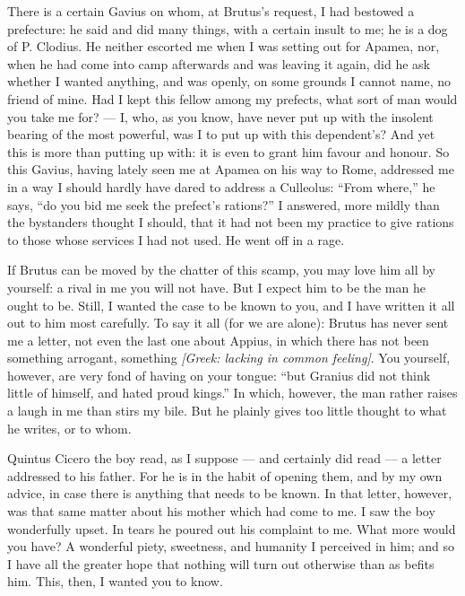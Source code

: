  There is a certain Gavius on whom, at Brutus's request, I had bestowed a prefecture: he said and did many things, with a certain insult to me; he is a dog of P. Clodius. He neither escorted me when I was setting out for Apamea, nor, when he had come into camp afterwards and was leaving it again, did he ask whether I wanted anything, and was openly, on some grounds I cannot name, no friend of mine. Had I kept this fellow among my prefects, what sort of man would you take me for? --- I, who, as you know, have never put up with the insolent bearing of the most powerful, was I to put up with this dependent's? And yet this is more than putting up with: it is even to grant him favour and honour. So this Gavius, having lately seen me at Apamea on his way to Rome, addressed me in a way I should hardly have dared to address a Culleolus: ``From where,'' he says, ``do you bid me seek the prefect's rations?'' I answered, more mildly than the bystanders thought I should, that it had not been my practice to give rations to those whose services I had not used. He went off in a rage.

 If Brutus can be moved by the chatter of this scamp, you may love him all by yourself: a rival in me you will not have. But I expect him to be the man he ought to be. Still, I wanted the case to be known to you, and I have written it all out to him most carefully. To say it all (for we are alone): Brutus has never sent me a letter, not even the last one about Appius, in which there has not been something arrogant, something \textit{[Greek: lacking in common feeling]}. You yourself, however, are very fond of having on your tongue: ``but Granius did not think little of himself, and hated proud kings.'' In which, however, the man rather raises a laugh in me than stirs my bile. But he plainly gives too little thought to what he writes, or to whom.

 Quintus Cicero the boy read, as I suppose --- and certainly did read --- a letter addressed to his father. For he is in the habit of opening them, and by my own advice, in case there is anything that needs to be known. In that letter, however, was that same matter about his mother which had come to me. I saw the boy wonderfully upset. In tears he poured out his complaint to me. What more would you have? A wonderful piety, sweetness, and humanity I perceived in him; and so I have all the greater hope that nothing will turn out otherwise than as befits him. This, then, I wanted you to know.

